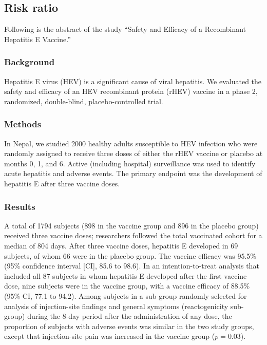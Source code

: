 \documentclass[11pt, chapterprefix=true]{scrbook}\usepackage[]{graphicx}\usepackage[]{color}
\begin{document}
\subsection{Risk ratio}

Following is the abstract of the study ``Safety and Efficacy of a Recombinant Hepatitis E Vaccine.''  %

\subsubsection{Background}

Hepatitis E virus (HEV) is a significant cause of viral hepatitis.  We evaluated
the safety and efficacy of an HEV recombinant protein (rHEV) vaccine in a phase
2, randomized, double-blind, placebo-controlled trial.

\subsubsection{Methods}

In Nepal, we studied 2000 healthy adults susceptible to HEV infection who were randomly assigned to receive three doses of either the rHEV vaccine or placebo at months 0, 1, and 6. Active (including hospital) surveillance was used to identify acute hepatitis and adverse events. The primary endpoint was the development of hepatitis E after three vaccine doses.

\subsubsection{Results}

A total of 1794 subjects (898 in the vaccine group and 896 in the placebo group) received three vaccine doses; researchers followed the total vaccinated cohort for a median of 804 days.  After three vaccine doses, hepatitis E developed in 69 subjects, of whom 66 were in the placebo group.  The vaccine efficacy was 95.5\% (95\% confidence interval [CI], 85.6 to 98.6).  In an intention-to-treat analysis that included all 87 subjects in whom hepatitis E developed after the first vaccine dose, nine subjects were in the vaccine group, with a vaccine efficacy of 88.5\% (95\% CI, 77.1 to 94.2).  Among subjects in a sub-group randomly selected for analysis of injection-site findings and general symptoms (reactogenicity sub-group) during the 8-day period after the administration of any dose, the proportion of subjects with adverse events was similar in the two study groups, except that injection-site pain was increased in the vaccine group ($p = 0.03$).
\end{document}
